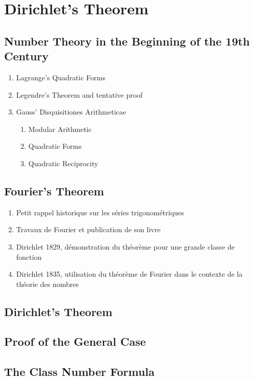 \chapter{Dirichlet's Theorem}

\section{Number Theory in the Beginning of the 19th Century}

\td

\begin{enumerate}
    \item Lagrange's Quadratic Forms 
    \item Legendre's Theorem and tentative proof
    \item Gauss' Disquisitiones Arithmeticae
    \begin{enumerate}
        \item Modular Arithmetic
        \item Quadratic Forms 
        \item Quadratic Reciprocity 
    \end{enumerate}
\end{enumerate}

\noindent\td 

\section{Fourier's Theorem}

\td

\begin{enumerate}
    \item Petit rappel historique sur les séries trigonométriques
    \item Travaux de Fourier et publication de son livre
    \item Dirichlet 1829, démonstration du théorème pour une grande classe de fonction
    \item Dirichlet 1835, utilisation du théorème de Fourier dans le contexte de la théorie des nombres
\end{enumerate}

\noindent\td 

\section{Dirichlet's Theorem}

\td 

\section{Proof of the General Case}

\td 

\section{The Class Number Formula}

\td